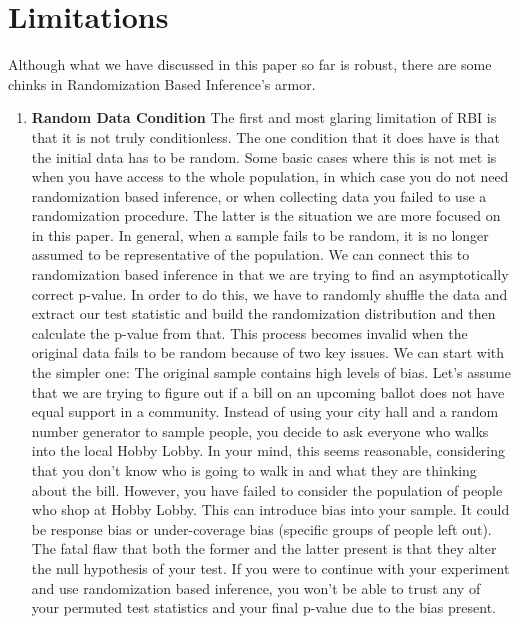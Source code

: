 
\section{Limitations}

Although what we have discussed in this paper so far is robust, there are some chinks in Randomization Based Inference’s armor. 

\begin{enumerate}
    \item \textbf{Random Data Condition} \newline
	The first and most glaring limitation of RBI is that it is not truly conditionless. The one condition that it does have is that the initial data has to be random. Some basic cases where this is not met is when you have access to the whole population, in which case you do not need randomization based inference, or when collecting data you failed to use a randomization procedure. The latter is the situation we are more focused on in this paper. In general, when a sample fails to be random, it is no longer assumed to be representative of the population. 
	We can connect this to randomization based inference in that we are trying to find an asymptotically correct p-value. In order to do this, we have to randomly shuffle the data and extract our test statistic and build the randomization distribution and then calculate the p-value from that. This process becomes invalid when the original data fails to be random because of two key issues. We can start with the simpler one: The original sample contains high levels of bias. Let’s assume that we are trying to figure out if a bill on an upcoming ballot does not have equal support in a community. Instead of using your city hall and a random number generator to sample people, you decide to ask everyone who walks into the local Hobby Lobby. In your mind, this seems reasonable, considering that you don’t know who is going to walk in and what they are thinking about the bill. However, you have failed to consider the population of people who shop at Hobby Lobby. This can introduce bias into your sample. It could be response bias or under-coverage bias (specific groups of people left out). The fatal flaw that both the former and the latter present is that they alter the null hypothesis of your test. If you were to continue with your experiment and use randomization based inference, you won’t be able to trust any of your permuted test statistics and your final p-value due to the bias present. \newline\\

\end{enumerate}
